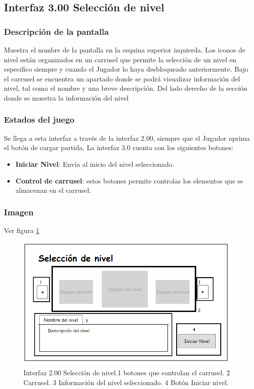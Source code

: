 \documentclass[11pt,letterpaper]{article}
\begin{document}
\subsection{Interfaz 3.00 Selección de nivel}
	\subsubsection{Descripción de la pantalla}
Muestra el nombre de la pantalla en la esquina superior izquierda.
Los iconos de nivel están organizados en un carrusel que permite la selección de un nivel en especifico siempre y cuando el Jugador lo haya desbloqueado anteriormente.  
Bajo el carrusel se encuentra un apartado donde se podrá visualizar información del nivel, tal como el nombre y una breve descripción.
Del lado derecho de la sección donde se muestra la información del nivel 
	\subsubsection{Estados del juego}
Se llega a esta interfaz a través de la interfaz 2.00, siempre que el Jugador oprima el botón de cargar partida.
La interfaz 3.0 cuenta con los siguientes botones:
\begin{itemize}
	\item \textbf{Iniciar Nivel}: Envía al inicio del nivel seleccionado.
	\item \textbf{Control de carrusel}: estos botones permite controlas los elementos que se almacenan en el carrusel.
\end{itemize} 
	\subsubsection{Imagen}
	Ver figura \ref{fig:SelNivel}
\begin{figure}
  \centering
   \includegraphics[width=0.6 \textwidth]{Imagenes/interfaz02_01}
  \caption{Interfaz 2.00 Selección de nivel.1 botones que controlan el carrusel. 2 Carrusel. 3 Información del nivel seleccionado. 4 Botón Iniciar nivel.}
  \label{fig:SelNivel}
\end{figure} 
 
\end{document}
